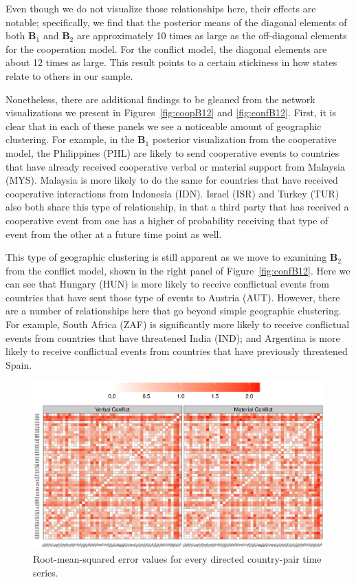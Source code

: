 \documentclass[3p,times,twocolumn,authoryear,12pt]{elsarticle}
\newcommand{\bl}[1]{{\mathbf #1}}
\begin{document}
Even though we do not visualize those relationships here, their effects are notable; specifically, we find that the posterior means of the diagonal elements of both $\bl B_{1}$ and $\bl B_{2}$ are approximately 10 times as large as the off-diagonal elements for the cooperation model. For the conflict model, the diagonal elements are about 12 times as large. This result points to a certain stickiness in how states relate to others in our sample.

Nonetheless, there are additional findings to be gleaned from the network visualizations we present in Figures~\ref{fig:coopB12} and \ref{fig:confB12}. First, it is clear that in each of these panels we see a noticeable amount of geographic clustering. For example, in the $\bl B_1$ posterior visualization from the cooperative model, the Philippines (PHL) are likely to send cooperative events to countries that have already received cooperative verbal or material support from Malaysia (MYS). Malaysia is more likely to do the same for countries that have received cooperative interactions from Indonesia (IDN). Israel (ISR) and Turkey (TUR) also both share this type of relationship, in that a third party that has received a cooperative event from one has a higher of probability receiving that type of event from the other at a future time point as well. 

This type of geographic clustering is still apparent as we move to examining $\bl B_2$ from the  conflict model, shown in the right panel of Figure~\ref{fig:confB12}. Here we can see that Hungary (HUN) is more likely to receive conflictual events from countries that have sent those type of events to Austria (AUT). However, there are a number of relationships here that go beyond simple geographic clustering. For example, South Africa (ZAF) is significantly more likely to receive conflictual events from countries that have threatened India (IND); and Argentina is more likely to receive conflictual events from countries that have previously threatened Spain. 

\begin{figure}[!ht]
	\centering
	\includegraphics[width=.8\textwidth]{Conf_iperf}
	\caption{Root-mean-squared error values for every directed country-pair time series.}
	\label{fig:perf}
\end{figure}
\end{document}
